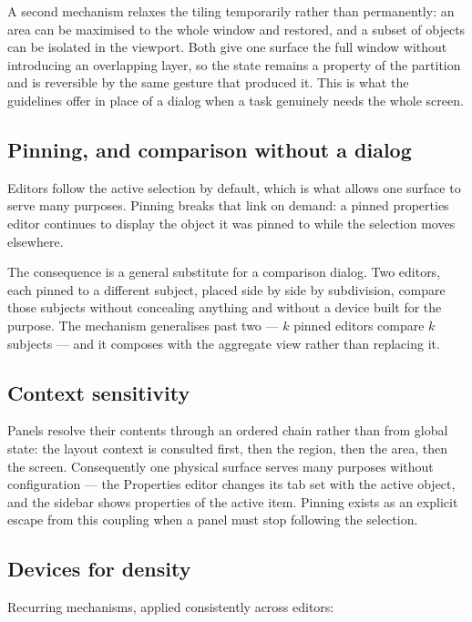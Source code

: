 \documentclass[11pt,a4paper]{article}
\begin{document}
A second mechanism relaxes the tiling temporarily rather than permanently: an
area can be maximised to the whole window and restored, and a subset of objects
can be isolated in the viewport. Both give one surface the full window without
introducing an overlapping layer, so the state remains a property of the
partition and is reversible by the same gesture that produced it. This is what
the guidelines offer in place of a dialog when a task genuinely needs the whole
screen.

\subsection{Pinning, and comparison without a dialog}

Editors follow the active selection by default, which is what allows one surface
to serve many purposes. Pinning breaks that link on demand: a pinned properties
editor continues to display the object it was pinned to while the selection
moves elsewhere.

The consequence is a general substitute for a comparison dialog. Two editors,
each pinned to a different subject, placed side by side by subdivision, compare
those subjects without concealing anything and without a device built for the
purpose. The mechanism generalises past two --- $k$ pinned editors compare $k$
subjects --- and it composes with the aggregate view rather than replacing it.

\subsection{Context sensitivity}

Panels resolve their contents through an ordered chain rather than from global
state: the layout context is consulted first, then the region, then the area,
then the screen. Consequently one physical surface serves many purposes without
configuration --- the Properties editor changes its tab set with the active
object, and the sidebar shows properties of the active item. Pinning exists as
an explicit escape from this coupling when a panel must stop following the
selection.

\subsection{Devices for density}

Recurring mechanisms, applied consistently across editors:
\end{document}
